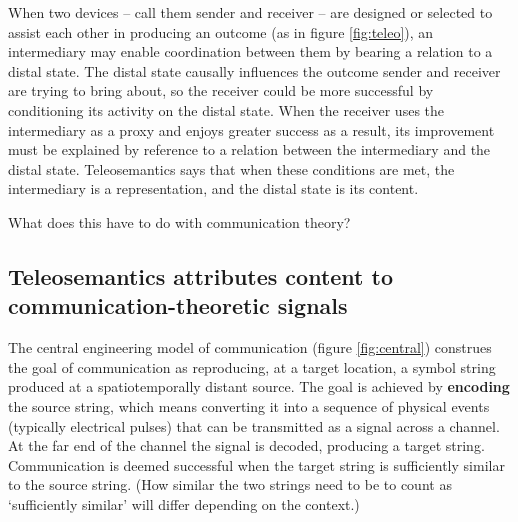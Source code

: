 \documentclass[12pt]{article}
\begin{document}
When two devices -- call them sender and receiver -- are designed or selected to assist each other in producing an outcome (as in figure \ref{fig:teleo}), an intermediary may enable coordination between them by bearing a relation to a distal state.
The distal state causally influences the outcome sender and receiver are trying to bring about, so the receiver could be more successful by conditioning its activity on the distal state.
When the receiver uses the intermediary as a proxy and enjoys greater success as a result, its improvement must be explained by reference to a relation between the intermediary and the distal state.
Teleosemantics says that when these conditions are met, the intermediary is a representation, and the distal state is its content.

What does this have to do with communication theory?

\subsection{Teleosemantics attributes content to communication-theoretic signals}


The central engineering model of communication (figure \ref{fig:central}) construes the goal of communication as reproducing, at a target location, a symbol string produced at a spatiotemporally distant source.
The goal is achieved by \textbf{encoding} the source string, which means converting it into a sequence of physical events (typically electrical pulses) that can be transmitted as a signal across a channel.
At the far end of the channel the signal is decoded, producing a target string.
Communication is deemed successful when the target string is sufficiently similar to the source string.
(How similar the two strings need to be to count as `sufficiently similar' will differ depending on the context.)


\end{document}
